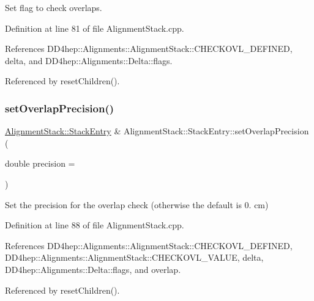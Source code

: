 Set flag to check overlaps. 



Definition at line 81 of file Alignment\+Stack.\+cpp.



References D\+D4hep\+::\+Alignments\+::\+Alignment\+Stack\+::\+C\+H\+E\+C\+K\+O\+V\+L\+\_\+\+D\+E\+F\+I\+N\+ED, delta, and D\+D4hep\+::\+Alignments\+::\+Delta\+::flags.



Referenced by reset\+Children().

\hypertarget{struct_d_d4hep_1_1_alignments_1_1_alignment_stack_1_1_stack_entry_a0b82028a7597f34015a833c6273bd36b}{}\label{struct_d_d4hep_1_1_alignments_1_1_alignment_stack_1_1_stack_entry_a0b82028a7597f34015a833c6273bd36b} 
\subsubsection{\texorpdfstring{set\+Overlap\+Precision()}{setOverlapPrecision()}}
{\footnotesize\ttfamily \hyperlink{struct_d_d4hep_1_1_alignments_1_1_alignment_stack_1_1_stack_entry}{Alignment\+Stack\+::\+Stack\+Entry} \& Alignment\+Stack\+::\+Stack\+Entry\+::set\+Overlap\+Precision (\begin{DoxyParamCaption}\item[{double}]{precision = {} }\end{DoxyParamCaption})}



Set the precision for the overlap check (otherwise the default is 0. cm) 



Definition at line 88 of file Alignment\+Stack.\+cpp.



References D\+D4hep\+::\+Alignments\+::\+Alignment\+Stack\+::\+C\+H\+E\+C\+K\+O\+V\+L\+\_\+\+D\+E\+F\+I\+N\+ED, D\+D4hep\+::\+Alignments\+::\+Alignment\+Stack\+::\+C\+H\+E\+C\+K\+O\+V\+L\+\_\+\+V\+A\+L\+UE, delta, D\+D4hep\+::\+Alignments\+::\+Delta\+::flags, and overlap.



Referenced by reset\+Children().

